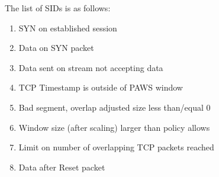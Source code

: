 \documentclass[english]{report}
\newenvironment{note}{
\samepage
    \vspace{10pt}{\textsf{
        {\hspace{7pt}\Huge{$\triangle$\hspace{-12.5pt}{\Large{$^!$}}}}\hspace{5pt}
        {\Large{NOTE}}
    }
    }
   \begin{center}
    \par\vspace{-17pt}

    \begin{lrbox}{\savepar}
    \begin{minipage}[r]{6in}
}
{
    \end{minipage}
    \end{lrbox}
    \fbox{
        \usebox{
            \savepar
	}
    }
    \par\vskip10pt
    \end{center}
}
\begin{document}
The list of SIDs is as follows:
\begin{enumerate}
\item{SYN on established session}
\item{Data on SYN packet}
\item{Data sent on stream not accepting data}
\item{TCP Timestamp is outside of PAWS window}
\item{Bad segment, overlap adjusted size less than/equal 0}
\item{Window size (after scaling) larger than policy allows}
\item{Limit on number of overlapping TCP packets reached}
\item{Data after Reset packet}
\end{enumerate}


\end{document}
